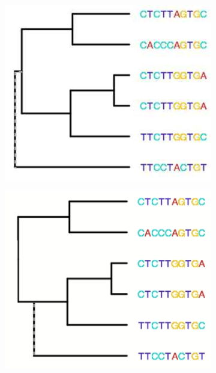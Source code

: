 \documentclass[]{article}
\begin{document}
\begin{figure}[H]
	\caption[Long branches attract each other]{Long branches attract each other. Where to group the lowest sequence?}\label{fig:long:branches}
	\begin{subfigure}[b]{0.3\textwidth}
		\includegraphics[width=\textwidth]{LongBranchAttraction0}
	\end{subfigure}
	\begin{subfigure}[b]{0.3\textwidth}
		\includegraphics[width=\textwidth]{LongBranchAttraction1}

\end{subfigure}
\end{figure}
\end{document}
